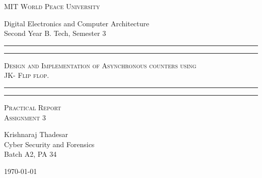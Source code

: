 \documentclass[11pt]{article}
\begin{document}
\begin{titlepage}
	\centering


	\huge\textsc{
		MIT World Peace University
	}\\

	\vspace{0.75\baselineskip} %

	\LARGE{
		Digital Electronics and Computer Architecture\\
		Second Year B. Tech, Semester 3
	}

	\vfill %


	\rule{\textwidth}{1.6pt}\vspace*{-\baselineskip}\vspace*{2pt}
	\rule{\textwidth}{0.6pt}
	\vspace{0.75\baselineskip} %



	\huge{\textsc{
			Design and Implementation of Asynchronous counters using\\ JK- Flip flop.
		}} \\



	\vspace{0.5\baselineskip} %
	\rule{\textwidth}{0.6pt}\vspace*{-\baselineskip}\vspace*{2.8pt}
	\rule{\textwidth}{1.6pt}

	\vspace{1\baselineskip} %


	\LARGE\textsc{
		Practical Report\\
		Assignment 3
	} %
	\vfill


	\vspace{0.5\baselineskip} %

	\Large{
		Krishnaraj Thadesar \\
		Cyber Security and Forensics\\
		Batch A2, PA 34
	}


	\vspace{0.5\baselineskip} %
	\today

\end{titlepage}
\end{document}
